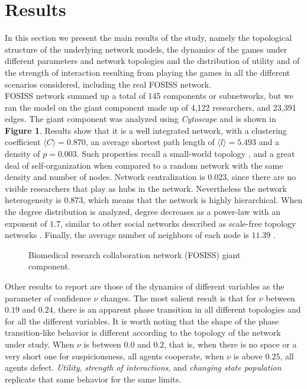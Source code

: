 \documentclass{bmcart}
\def\texttt{[image: ]}
\begin{document}
\section*{Results}

In this section we present the main results of the study, namely the
topological structure of the underlying network models, the dynamics
of the games under different parameters and network topologies and the
distribution of utility and of the strength of interaction resulting
from playing the games in all the different scenarios considered,
including the real FOSISS network.\\


FOSISS network summed up a total of 145 components or subnetworks, but
we ran the model on the giant component made up of 4,122 researchers,
and 23,391 edges.  The giant component was analyzed using
\textit{Cytoscape} and is shown in \textbf{Figure 1}. Results show
that it is a well integrated network, with a clustering coefficient
$\langle C \rangle = 0.870$, an average shortest path length of
$\langle l \rangle = 5.493$ and a density of $p = 0.003$. Such
properties recall a small-world topology \cite{WattsStrogatz:98}, and
a great deal of self-organization when compared to a random network
with the same density and number of nodes. Network centralization is
$0.023$, since there are no visible researchers that play as hubs in
the network. Nevertheless the network heterogeneity is $0.873$, which
means that the network is highly hierarchical. When the degree
distribution is analyzed, degree decreases as a power-law with an
exponent of $1.7$, similar to other social networks described as
scale-free topology networks \cite{BarabasiAlbert:99}. Finally, the
average number
of neighbors of each node is $11.39$ \cite{Shannon:2003}.\\


\begin{figure} [h!]
\centering
\caption{Biomedical research collaboration network (FOSISS) giant component.}\label{Fosiss_GC}
\end{figure}


Other results to report are those of the dynamics of different
variables as the parameter of confidence $\nu$ changes. The  most salient
result is that for $\nu$ between $0.19$ and $0.24$, there is an
apparent phase transition in all different topologies and for all the
different variables. It is worth noting that the shape
of the phase transition-like behavior is different according to the topology of the
network under study. When $\nu$ is between $0.0$ and $0.2$, that is, when there is
no space or a very short one for suspiciousness, all agents cooperate, when
$\nu$ is above $0.25$, all agents defect. \textit{Utility},
\textit{strength of interactions}, and \textit{changing state population}
replicate that same behavior for the same limits. \\ 
\end{document}
